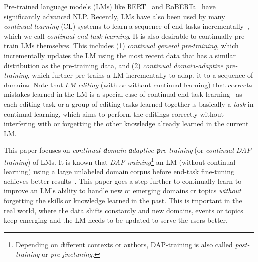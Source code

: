 \documentclass{article} \usepackage{iclr2023_conference,times}
\begin{document}
{\color{black}
Pre-trained language models (LMs) like BERT~\citep{DBLP:conf/naacl/DevlinCLT19} and RoBERTa~\citep{DBLP:journals/corr/abs-1907-11692} have significantly advanced NLP. Recently, LMs have also been used by many \textit{continual learning} (CL) systems to learn a sequence of end-tasks incrementally~\citep{ke2021achieving,sun2020lamol,huang2021continual}, which we call \textit{continual end-task learning}. {\color{black}It is also desirable to continually pre-train LMs themselves}. 
This includes (1) \textit{continual general pre-training}, which incrementally updates the LM using the most recent data that has a similar distribution as the pre-training data, and (2) \textit{continual domain-adaptive pre-training}, {\color{black}which 
further pre-trains a LM incrementally} 
to adapt it to a sequence of domains. Note that \textit{LM editing} (with or without continual learning) \citep{DBLP:conf/iclr/MitchellLBFM22} that corrects mistakes learned in the LM is {\color{black}a special case of continual end-task learning{\color{black}~\citep{kim2022theoretical}}
as each editing task or a group of editing tasks learned together is basically a \textit{task} in continual learning, which aims to perform the editings correctly without interfering with or forgetting the other knowledge already learned in the current LM}. } 

This paper focuses on \textit{continual \textbf{d}omain-\textbf{a}daptive \textbf{p}re-training} (or \textit{continual DAP-training}) of LMs. It is known that \textit{DAP-training}\footnote{{\color{black}Depending on different contexts or authors, DAP-training is also called \textit{post-training} or \textit{pre-finetuning}.}} an LM (without continual learning) using a large unlabeled domain corpus before end-task fine-tuning achieves better results~\citep{DBLP:conf/acl/GururanganMSLBD20,DBLP:conf/naacl/XuLSY19,ke2022dga}. This paper goes a step further to continually learn to improve an LM's ability to handle new or emerging domains or topics \textit{without} forgetting the skills or knowledge learned in the past. This is important in the real world, where the data shifts constantly and new domains, events or topics keep emerging  \citep{ke2022dga} and the LM needs to be updated to serve the users better. 
\end{document}
